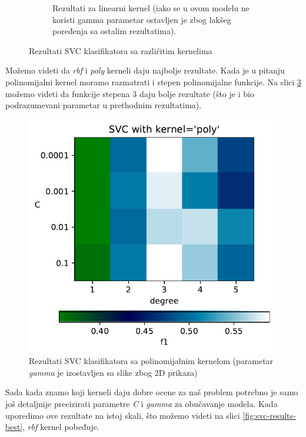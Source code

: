 \documentclass[a4paper]{article}
\begin{document}
\begin{figure}
\begin{subfigure}{.5\textwidth}
		\caption{Rezultati za linearni kernel (iako se u ovom modelu ne koristi gamma parametar ostavljen je zbog lakšeg poređenja sa ostalim rezultatima).}
		\label{fig:sub4}
	\end{subfigure}
	\caption{Rezultati SVC klasifikatora sa različitim kernelima}
	\label{fig:svc-results}
\end{figure}

Možemo videti da \textit{rbf} i \textit{poly} kerneli daju najbolje rezultate. Kada je u pitanju polinomijalni kernel moramo razmatrati i stepen polinomijalne funkcije. Na slici \ref{fig:svc-poly-degree} možemo videti da funkcije stepena 3 daju bolje rezultate (što je i bio podrazumevani parametar u prethodnim rezultatima).

\begin{figure}
	\centering
	\includegraphics[width=.4\linewidth]{images/SVC_poly_degree.pdf}
	\caption{Rezultati SVC klasifikatora sa polinomijalnim kernelom (parametar \textit{gamma} je izostavljen sa slike zbog 2D prikaza)}
	\label{fig:svc-poly-degree}
\end{figure}

Sada kada znamo koji kerneli daju dobre ocene za naš problem potrebno je samo još detaljnije precizirati parametre \textit{C} i \textit{gamma} za obučavanje modela. Kada uporedimo ove rezultate na istoj skali, što možemo videti na slici \ref{fig:svc-results-best}, \textit{rbf} kernel pobeđuje.
\end{document}
